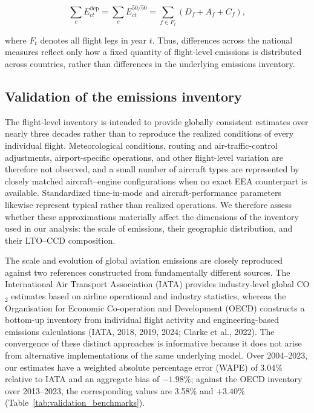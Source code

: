 \documentclass[12pt]{extarticle}
\begin{document}
\begin{equation}
\sum_c E^{\mathrm{dep}}_{ct}
=
\sum_c E^{50/50}_{ct}
=
\sum_{f\in F_t}
\left(D_f+A_f+C_f\right),
\label{eq:nature_8}
\end{equation}

where $F_t$ denotes all flight legs in year $t$. Thus, differences across the national measures reflect only how a fixed quantity of flight-level emissions is distributed across countries, rather than differences in the underlying emissions inventory.

\subsection*{Validation of the emissions inventory}

The flight-level inventory is intended to provide globally consistent estimates over nearly three decades rather than to reproduce the realized conditions of every individual flight. Meteorological conditions, routing and air-traffic-control adjustments, airport-specific operations, and other flight-level variation are therefore not observed, and a small number of aircraft types are represented by closely matched aircraft--engine configurations when no exact EEA counterpart is available. Standardized time-in-mode and aircraft-performance parameters likewise represent typical rather than realized operations. We therefore assess whether these approximations materially affect the dimensions of the inventory used in our analysis: the scale of emissions, their geographic distribution, and their LTO--CCD composition.

The scale and evolution of global aviation emissions are closely reproduced against two references constructed from fundamentally different sources. The International Air Transport Association (IATA) provides industry-level global CO$_2$ estimates based on airline operational and industry statistics, whereas the Organisation for Economic Co-operation and Development (OECD) constructs a bottom-up inventory from individual flight activity and engineering-based emissions calculations (IATA, 2018, 2019, 2024; Clarke et al., 2022). The convergence of these distinct approaches is informative because it does not arise from alternative implementations of the same underlying model. Over 2004--2023, our estimates have a weighted absolute percentage error (WAPE) of 3.04\% relative to IATA and an aggregate bias of $-1.98\%$; against the OECD inventory over 2013--2023, the corresponding values are 3.58\% and $+3.40\%$ (Table~\ref{tab:validation_benchmarks}).
\end{document}
